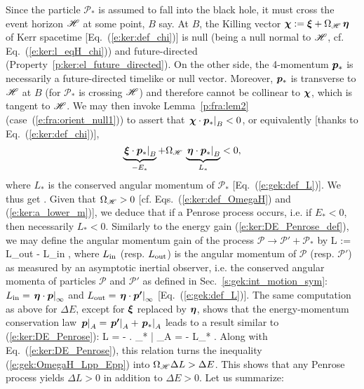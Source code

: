 Since the particle $\mathscr{P}_*$ is assumed to fall into the black hole,
it must cross the event horizon $\mathscr{H}$ at some point, $B$ say. At $B$, the
Killing vector $\bm{\chi} := \bm{\xi} + \Omega_{\mathscr{H}} \, \bm{\eta}$ of Kerr spacetime [Eq.~(\ref{e:ker:def_chi})] is null (being a null normal to $\mathscr{H}$, cf. Eq.~(\ref{e:ker:l_eqH_chi}))
and future-directed (Property~\ref{p:ker:el_future_directed}).
On the other side, the
4-momentum $\bm{p}_*$ is necessarily a future-directed timelike or null vector.
Moreover, $\bm{p}_*$
is transverse to $\mathscr{H}$ at $B$ (for $\mathscr{P}_*$ is crossing $\mathscr{H}$)
and therefore cannot be collinear to $\bm{\chi}$, which is tangent to $\mathscr{H}$.
We may then invoke Lemma~\ref{p:fra:lem2} (case~(\ref{e:fra:orient_null1}))
to assert that $\left. \bm{\chi}\cdot\bm{p}_* \right| _B < 0$, or equivalently
[thanks to Eq.~(\ref{e:ker:def_chi})],
\[
    \underbrace{\left.\bm{\xi}\cdot\bm{p}_* \right| _B}_{-E_*}
    + \Omega_{\mathscr{H}} \, \underbrace{\left.\bm{\eta}\cdot\bm{p}_* \right| _B}_{L_*} < 0 ,
\]
where $L_*$ is the conserved angular momentum of $\mathscr{P}_*$ [Eq.~(\ref{e:gek:def_L})].
We thus get
\be \label{e:gek:OmegaH_Lpp_Epp}
    .
\ee
Given that $\Omega_{\mathscr{H}} > 0$ [cf. Eqs.~(\ref{e:ker:def_OmegaH}) and (\ref{e:ker:a_lower_m})],
we deduce that if a Penrose process occurs, i.e. if $E_* < 0$, then necessarily $L_* < 0$.
Similarly to the energy gain (\ref{e:ker:DE_Penrose_def}), we may define the
angular momentum gain of the process $\mathscr{P} \to \mathscr{P}' + \mathscr{P}_*$ by
\be
    \Delta L := L_{\rm out} - L_{\rm in} ,
\ee
where $L_{\rm in}$ (resp. $L_{\rm out}$) is the angular momentum of $\mathscr{P}$
(resp. $\mathscr{P}'$) as measured by an asymptotic inertial observer, i.e.
the conserved angular momenta of particles $\mathscr{P}$ and $\mathscr{P}'$
as defined in Sec.~\ref{s:gek:int_motion_sym}:
$L_{\rm in} =  \left.  \bm{\eta} \cdot \bm{p} \right| _{\infty}$
and
$L_{\rm out} = \left.  \bm{\eta} \cdot \bm{p'} \right| _{\infty}$
[Eq.~(\ref{e:gek:def_L})]. The same computation as above for
$\Delta E$, except for $\bm{\xi}$ replaced by $\bm{\eta}$, shows that the
energy-momentum conservation law
$\left. \bm{p} \right| _{A} = \left. \bm{p'} \right| _{A} + \left. \bm{p}_* \right| _{A}$
leads to a result similar to (\ref{e:ker:DE_Penrose}):
\be
    \Delta L = - \left. \w{\eta} \cdot {}_* \right| _{A} = - L_* .
\ee
Along with Eq.~(\ref{e:ker:DE_Penrose}), this relation turns the inequality
(\ref{e:gek:OmegaH_Lpp_Epp}) into $\Omega_{\mathscr{H}}\Delta L > \Delta E$.
This shows that any Penrose process yields $\Delta L > 0$ in addition to
$\Delta E > 0$. Let us summarize:


